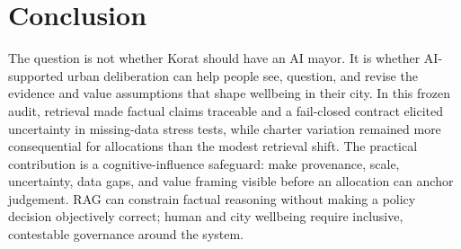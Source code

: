 \documentclass[sigconf,anonymous]{acmart}
\begin{document}
\section{Conclusion}
The question is not whether Korat should have an AI mayor. It is whether AI-supported urban deliberation can help people see, question, and revise the evidence and value assumptions that shape wellbeing in their city. In this frozen audit, retrieval made factual claims traceable and a fail-closed contract elicited uncertainty in missing-data stress tests, while charter variation remained more consequential for allocations than the modest retrieval shift. The practical contribution is a cognitive-influence safeguard: make provenance, scale, uncertainty, data gaps, and value framing visible before an allocation can anchor judgement. RAG can constrain factual reasoning without making a policy decision objectively correct; human and city wellbeing require inclusive, contestable governance around the system.



\end{document}
